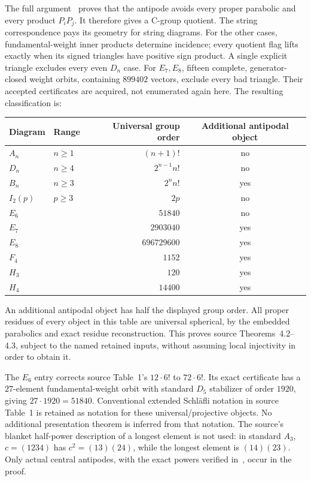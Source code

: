 \documentclass[11pt,a4paper]{article}
\begin{document}
The full argument~\cite{spherical} proves that the antipode avoids every
proper parabolic and every product $P_iP_j$. It therefore gives a C-group
quotient. The string correspondence pays its geometry for string diagrams.
For the other cases, fundamental-weight inner products determine incidence;
every quotient flag lifts exactly when its signed triangles have positive
sign product. A single explicit triangle excludes every even $D_n$ case.
For $E_7,E_8$, fifteen complete, generator-closed weight orbits, containing
$899402$ vectors, exclude every bad triangle. Their accepted certificates
are acquired, not enumerated again here. The resulting classification is:
\begin{center}\small
\begin{tabular}{llrc}\toprule
Diagram & Range & Universal group order & Additional antipodal object\\\midrule
$A_n$ &$n\ge1$&$(n+1)!$&no\\
$D_n$ &$n\ge4$&$2^{n-1}n!$&no\\
$B_n$ &$n\ge3$&$2^n n!$&yes\\
$I_2(p)$ &$p\ge3$&$2p$&no\\
$E_6$ &&$51840$&no\\
$E_7$ &&$2903040$&yes\\
$E_8$ &&$696729600$&yes\\
$F_4$ &&$1152$&yes\\
$H_3$ &&$120$&yes\\
$H_4$ &&$14400$&yes\\\bottomrule
\end{tabular}
\end{center}
An additional antipodal object has half the displayed group order. All
proper residues of every object in this table are universal spherical,
by the embedded parabolics and exact residue reconstruction. This proves
source Theorems~4.2--4.3, subject to the named retained inputs, without
assuming local injectivity in order to obtain it.

The $E_6$ entry corrects source Table~1's $12\cdot6!$ to $72\cdot6!$.
Its exact certificate has a $27$-element fundamental-weight orbit with
standard $D_5$ stabilizer of order $1920$, giving $27\cdot1920=51840$.
Conventional extended Schl\"afli notation in source Table~1 is retained
as notation for these universal/projective objects. No additional
presentation theorem is inferred from that notation. The source's blanket
half-power description of a longest element is not used: in standard
$A_3$, $c=(1234)$ has $c^2=(13)(24)$, while the longest element is
$(14)(23)$. Only actual central antipodes, with the exact powers verified
in~\cite{spherical}, occur in the proof.
\end{document}
